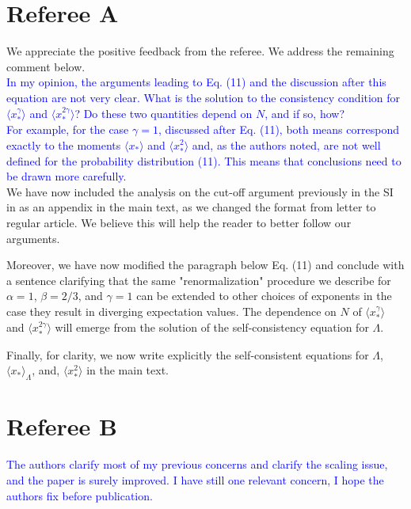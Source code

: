\documentclass{article}
\newcommand{\blue}{\textcolor{blue}}
\begin{document}
\section*{Referee A}

We appreciate the positive feedback from the referee. We address the remaining comment below. 
\\

\blue{In my opinion, the arguments leading to Eq. (11) and the discussion  after this equation are not very clear. 
What is the solution to the consistency condition for $\langle x_*^{\gamma}\rangle$ and $\langle x_*^{2\gamma}\rangle$?
Do these two quantities depend on $N$, and if so, how?} 
\\

\blue{For example, for the case $\gamma=1$, discussed after Eq. (11), both means correspond exactly to the moments $\langle x_*\rangle$ and $\langle x_*^2\rangle$ and, as the authors noted, are not well defined for the probability distribution (11). This means that conclusions need to be drawn more carefully.}
\\

We have now included the analysis on the cut-off argument previously in the SI in as an appendix in the main text, as we changed the format from letter to regular article. We believe this will help the reader to better follow our arguments.

Moreover, we have now modified the paragraph below Eq. (11) and conclude with a sentence clarifying that the same "renormalization" procedure we describe for $\alpha = 1$, $\beta = 2/3$, and $\gamma = 1$ can be extended to other choices of exponents in the case they result in diverging expectation values. The dependence on $N$ of $\langle x_*^{\gamma}\rangle$ and $\langle x_*^{2\gamma}\rangle$ will emerge from the solution of the self-consistency equation for $\Lambda$.

Finally, for clarity, we now write explicitly the self-consistent equations for $\Lambda$, $\langle x_{*}\rangle_{\Lambda}$, and, $\langle x_{*}^2\rangle$ in the main text.

\section*{Referee B}

\blue{The authors clarify most of my previous concerns and clarify the  
scaling issue, and the paper is surely improved. I have still one  
relevant concern, I hope the authors fix before publication.}  
\\
\end{document}
